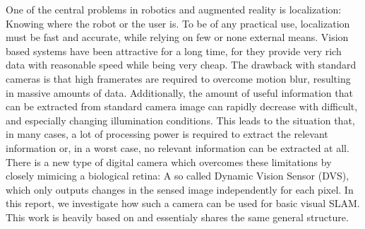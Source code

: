 One of the central problems in robotics and augmented reality is localization:
Knowing where the robot or the user is. To be of any practical use,
localization must be fast and accurate, while relying on few or none external
means.
Vision based systems have been attractive for a long time, for they
provide very rich data with reasonable speed while being very cheap. The
drawback with standard cameras is that high framerates are required to overcome
motion blur, resulting in massive amounts of data. Additionally, the amount of
useful information that can be extracted from standard camera image can rapidly
decrease with difficult, and especially changing illumination conditions. This
leads to the situation that, in many cases, a lot of processing power is
required to extract the relevant information or, in a worst case, no relevant
information can be extracted at all.  There is a new type of digital camera
which overcomes these limitations by closely mimicing a biological retina: A so
called Dynamic Vision Sensor (DVS), which only outputs changes in the sensed
image independently for each pixel.  In this report, we investigate how such a
camera can be used for basic visual SLAM.  This work is heavily based on
\cite{kim2014simultaneous} and essentialy shares the same general structure.
